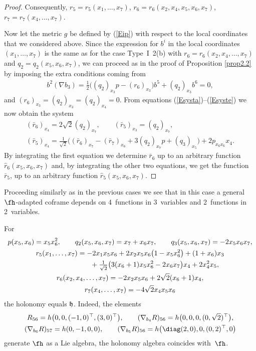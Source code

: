 \begin{proof}
Consequently, $r_5=r_5(x_1,\dots,x_7)$, $r_6=r_6(x_2, x_4, x_5, x_6, x_7)$, $r_7=r_7(x_4,\dots,x_7)$.

Now let the metric $g$ be defined by (\ref{Eip}) with respect to the local coordinates that we considered above. Since the expression for $b^i$ in the local coordinates $(x_1, \ldots, x_7)$ is the same as for the case Type~I~2(b) with $r_6 = r_6 (x_2, x_4, \ldots, x_7)$ and $q_2 = q_2(x_5,x_6,x_7)$, we can proceed as in the proof of Proposition \ref{prop2.2} by imposing the extra conditions coming from \begin{gather*}b^2 (\nabla b_3) = \tfrac{1}{2} \big( (q_2)_{x_3} p - (r_6)_{x_3} \big) b^5 + (q_2)_{x_3} b^6 =0,\end{gather*} and $ (r_6)_{x_3} =(q_2)_{x_3} = (q_2)_{x_4} =0$. From equations (\ref{Esysta})--(\ref{Esyste}) we now obtain the system
\begin{gather*}
(\bar r_6)_{x_4}=2\sqrt 2(q_2)_{x_7}, \qquad
(\bar r_5)_{x_3} = (q_2)_{x_7}, \\
(\bar r_5)_{x_4}=\tfrac 1{\sqrt2}\big((\bar r_6)_{x_7} - (\bar r_7)_{x_6} +3 (q_2)_{x_7}p +(q_3)_{x_5}\big) +2p_{x_6 x_6} x_4.
\end{gather*}
By integrating the first equation we determine $\bar r_6$ up to an arbitrary function $\hat r_6(x_5, x_6,x_7)$ and, by integrating the other two equations, we get the function $\bar r_5$, up to an arbitrary function $\hat r_5(x_5, x_6,x_7)$.
 \end{proof}

\begin{Remark} Proceeding similarly as in the previous cases we see that in this case a general $\fh$-adapted coframe depends on 4~functions in 3~variables and 2~functions in 2~variables.
\end{Remark}
\begin{Example} For \begin{gather*}
p(x_5,x_6)= x_5 x_6^2, \qquad
q_2(x_5,x_6, x_7) = x_7+x_6 x_7,\qquad
q_3(x_5,x_6,x_7) = -2 x_5 x_6 x_7 ,\\
r_5(x_1,\dots, x_7) = -2x_1 x_5 x_6 +2 x_2 x_5 x_6 \big(1- x_5x_6^2\big) + (1 + x_6) x_3 \\
\hphantom{r_5(x_1,\dots, x_7) =}{} + \tfrac1{\sqrt2}\big(3 ( x_6 +1) x_5 x_6^2 - 2 x_6 x_7 \big) x_4 + 2 x_4^2 x_5,\\
r_6(x_2, x_4, \dots, x_7) = -2x_2 x_5 x_6 + 2 \sqrt{2}(x_6 + 1) x_4,\\
r_7(x_4,\dots, x_7) = -4\sqrt 2 x_4 x_5 x_6
\end{gather*}
the holonomy equals $\frak h$. Indeed, the elements
\begin{gather*}
R_{56}=h\big(0,0, (-1,0)^\top,(3,0)^\top\big),\qquad (\nabla_{b_4} R)_{56}= h\big(0,0,0,(0,\sqrt{2})^\top\big),\\
(\nabla_{b_6} R)_{57}= h(0,-1,0,0), \qquad (\nabla_{b_5} R)_{56}= h\big(\diag(2,0),0,(0,2)^\top,0\big)
\end{gather*}
 generate $\fh$ as a Lie algebra, the holonomy algebra coincides with~$\fh$.
\end{Example}

